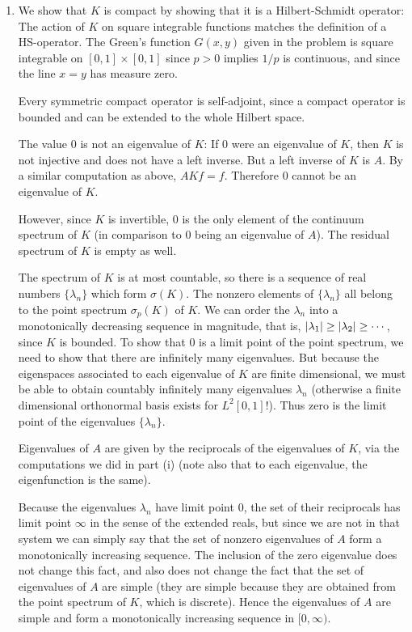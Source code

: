 \documentclass[11pt]{article}
\begin{document}
\begin{enumerate}[label=\textbf{\arabic*.}]
\begin{enumerate}[label=\textsf{(\roman*)}]
        \item We show that $K$ is compact by showing that it is a Hilbert-Schmidt operator: The action of $K$ on square integrable functions matches the definition of a HS-operator. The Green's function $G(x,y)$ given in the problem is square integrable on $[0,1]\times [0,1]$ since $p>0$ implies $1/p$ is continuous, and since the line $x=y$ has measure zero.
        
        Every symmetric compact operator is self-adjoint, since a compact operator is bounded and can be extended to the whole Hilbert space.

        The value $0$ is not an eigenvalue of $K$: If $0$ were an eigenvalue of $K$, then $K$ is not injective and does not have a left inverse. But a left inverse of $K$ is $A$. By a similar computation as above,  $AKf = f$. Therefore $0$ cannot be an eigenvalue of $K$.

        However, since $K$ is invertible, $0$ is the only element of the continuum spectrum of $K$ (in comparison to $0$ being an eigenvalue of $A$). The residual spectrum of $K$ is empty as well.

        The spectrum of $K$ is at most countable, so there is a sequence of real numbers $\{\lambda_n\}$ which form $\sigma(K)$. The nonzero elements of $\{\lambda_n\}$ all belong to the point spectrum $\sigma_p(K)$ of $K$. We can order the $\lambda_n$ into a monotonically decreasing sequence in magnitude, that is, $\abs{\lambda_1}\geq \abs{\lambda_2}\geq \cdots$, since $K$ is bounded. To show that $0$ is a limit point of the point spectrum, we need to show that there are infinitely many eigenvalues. But because the eigenspaces associated to each eigenvalue of $K$ are finite dimensional, we must be able to obtain countably infinitely many eigenvalues $\lambda_n$ (otherwise a finite dimensional orthonormal basis exists for $L^2[0,1]$!). Thus zero is the limit point of the eigenvalues $\{\lambda_n\}$.

        Eigenvalues of $A$ are given by the reciprocals of the eigenvalues of $K$, via the computations we did in part \textsf{(i)} (note also that to each eigenvalue, the eigenfunction is the same).

        Because the eigenvalues $\lambda_n$ have limit point $0$, the set of their reciprocals has limit point $\infty$ in the sense of the extended reals, but since we are not in that system we can simply say that the set of nonzero eigenvalues of $A$ form a monotonically increasing sequence. The inclusion of the zero eigenvalue does not change this fact, and also does not change the fact that the set of eigenvalues of $A$ are simple (they are simple because they are obtained from the point spectrum of $K$, which is discrete). Hence the eigenvalues of $A$ are simple and form a monotonically increasing sequence in $[0,\infty)$.


\end{enumerate}
\end{enumerate}
\end{document}
